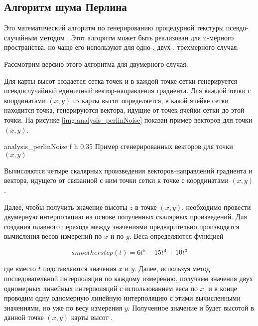 \subsection{Алгоритм шума Перлина}

Это математический алгоритм по генерированию процедурной текстуры псевдо-случайным методом \cite{info_perlinNoiseWiki}. 
Этот алгоритм может быть реализован для n-мерного пространства, но чаще его используют для одно-, двух-, трехмерного случая.

Рассмотрим версию этого алгоритма для двумерного случая:

Для карты высот создается сетка точек и в каждой точке сетки генерируется псевдослучайный единичный вектор-направления градиента. 
Для каждой точки с координатами $(x, y)$ из карты высот определяется, в какой ячейке сетки находится точка, генерируются вектора, идущие от точек ячейки сетки до этой точки.
На рисунке \ref{img:analysis_perlinNoise} показан пример векторов для точки $(x, y)$.

{analysis_perlinNoise} %
{f} %
{h} %
{0.35\textwidth} %
{Пример сгенерированных векторов для точки $(x, y)$} %

Вычисляются четыре скалярных произведения векторов-направлений
градиента и вектора, идущего от связанной с ним точки сетки к точке с
координатами $(x, y)$.

Далее, чтобы получить значение высоты $z$ в точке $(x, y)$, необходимо провести двумерную интерполяцию на основе полученных скалярных произведений. Для создания плавного перехода между значениями предварительно производятся вычисления весов измерений по $x$ и по $y$. Веса определяются функцией

\begin{equation}
	\label{equ:perlin}
	smootherstep(t) = 6t^5 - 15t^4 + 10t^3
\end{equation}
	
где вместо $t$ подставляются значения $x$ и $y$. 
Далее, используя метод последовательной интерполяции по каждому измерению, получаем значения двух одномерных линейных интерполяций с использованием веса по $x$, и в конце проводим одну одномерную линейную интерполяцию с этими вычисленными значениями, но уже по весу измерения $y$. 
Полученное значение и будет высотой в данной точке $(x, y)$ карты высот \cite{info_perlinNoise}. 

